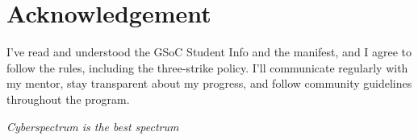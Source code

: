 \section{Acknowledgement}

I've read and understood the GSoC Student Info and the manifest, and I agree to follow the rules, including  the three-strike policy. I’ll communicate regularly with my mentor, stay transparent about my progress, and follow community guidelines throughout the program.

\vspace{1cm}

{
	\centering
	\textit{Cyberspectrum is the best spectrum}\par
}